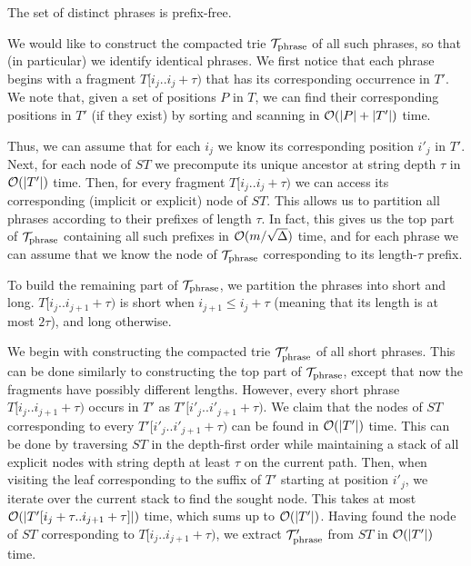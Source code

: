 \begin{observation}
\label{obs:prefixfree}
The set of distinct phrases is prefix-free.
\end{observation}

We would like to construct the compacted trie $\mathcal{T}_{\mathrm{phrase}}$ of all such phrases, so that (in particular) we identify identical
phrases. 
We first notice that each phrase begins with a fragment $T[i_{j}..i_{j}+\tau)$ that has its corresponding
occurrence in $T'$. We note that, given a set of positions $P$ in $T$, we can find their corresponding
positions in $T'$ (if they exist) by sorting and scanning in $\mathcal{O}(|P|+|T'|)$ time.



Thus, we can
assume that for each $i_{j}$ we know its corresponding position $i'_{j}$ in $T'$.
Next, for each node of $ST$ we precompute its unique ancestor at string depth $\tau$ in $\mathcal{O}(|T'|)$ time.
Then, for every fragment $T[i_{j}..i_{j}+\tau)$ we can access its corresponding (implicit or explicit)
node of $ST$. This allows us to partition all phrases according to their prefixes of length $\tau$.
In fact, this gives us the top part of $\mathcal{T}_{\mathrm{phrase}}$ containing all such prefixes in $\mathcal{O}(m/\sqrt{\Delta})$ time,
and for each phrase we can assume that we know the node of $\mathcal{T}_{\mathrm{phrase}}$ corresponding to its length-$\tau$
prefix. 

To build the remaining part of $\mathcal{T}_{\mathrm{phrase}}$, we partition the phrases into short and long.
$T[i_{j}.. i_{j+1}+\tau)$ is short when $i_{j+1} \leq i_{j}+\tau$ (meaning that its length is at most $2\tau$), and long otherwise.

We begin with constructing the compacted trie $\mathcal{T}_{\mathrm{phrase}}'$ of all short phrases.
This can be done similarly to constructing the top part of $\mathcal{T}_{\mathrm{phrase}}$, except that now
the fragments have possibly different lengths. However, every short phrase $T[i_{j}..i_{j+1}+\tau)$
occurs in $T'$ as $T'[i'_{j}..i'_{j+1}+\tau)$. We claim that the nodes of $ST$ corresponding
to every $T'[i'_{j}..i'_{j+1}+\tau)$ can be found in $\mathcal{O}(|T'|)$ time. This can be done
by traversing $ST$ in the depth-first order while maintaining a stack of all explicit nodes with string depth at least $\tau$
on the current path. Then, when visiting the leaf
corresponding to the suffix of $T'$ starting at position $i'_{j}$, we iterate over the current
stack to find the sought node. This takes at most $\mathcal{O}(|T'[i_{j}+\tau..i_{j+1}+\tau]|)$ time,
which sums up to $\mathcal{O}(|T'|)$. Having found the node of $ST$ corresponding to $T[i_{j}..i_{j+1}+\tau)$,
we extract $\mathcal{T}_{\mathrm{phrase}}'$ from $ST$ in $\mathcal{O}(|T'|)$ time.

